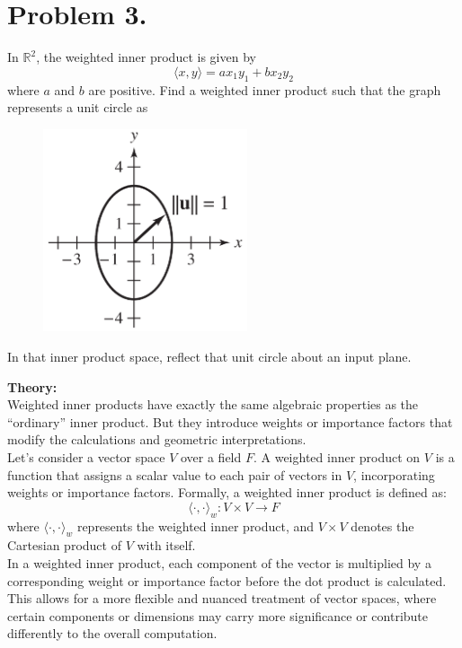 \clearpage
\section{ Problem 3.}
In $\mathbb{R}^2$, the weighted inner product is given by
$$ \langle x, y \rangle = ax_1y_1 + bx_2y_2 $$
where $a$ and $b$ are positive. Find a weighted inner product such that
the graph represents a unit circle as
\begin{figure}[H]
    \centering
    \includegraphics[width=6cm]{graphics/3_0.png}
\end{figure}
In that inner product space, reflect that unit circle about an input
plane.

\vspace*{1cm}

\textbf{Theory:}\\[6pt]
Weighted inner products have exactly the same algebraic properties
as the “ordinary” inner product. But they introduce weights or importance factors that modify the calculations and geometric interpretations. \\[6pt]
Let's consider a vector space $V$ over a field $F$. A weighted inner product on $V$ is a function that assigns a scalar value to each pair of vectors in $V$, incorporating weights or importance factors. Formally, a weighted inner product is defined as:
$$ \langle \cdot,\cdot \rangle_w : V \times V \rightarrow F $$
where $\langle \cdot,\cdot \rangle_w$ represents the weighted inner product, and $V \times V$ denotes the Cartesian product of $V$ with itself. \\[6pt]
In a weighted inner product, each component of the vector is multiplied by a corresponding weight or importance factor before the dot product is calculated. This allows for a more flexible and nuanced treatment of vector spaces, where certain components or dimensions may carry more significance or contribute differently to the overall computation. \\[6pt]

